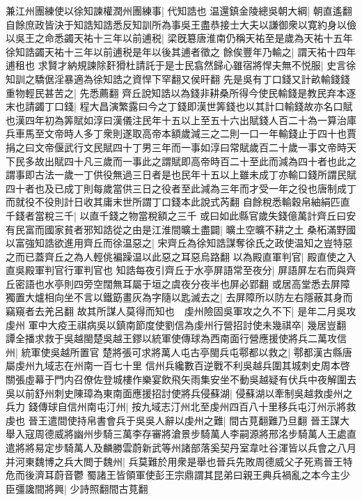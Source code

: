 兼江州團練使以徐知諫權潤州團練事|{
	代知誥也}
温還鎮金陵總吳朝大綱|{
	朝直遙翻}
自餘庶政皆決于知誥知誥悉反知訓所為事吳王盡恭接士大夫以謙御衆以寛約身以儉以吳王之命悉蠲天祐十三年以前逋税|{
	梁旣簒唐淮南仍稱天祐至是歲為天祐十五年徐知誥蠲天祐十三年以前逋税是年以後其逋者徵之}
餘俟豐年乃輸之|{
	謂天祐十四年逋租也}
求賢才納規諫除姧猾杜請託于是士民翕然歸心雖宿將悍夫無不悦服|{
	史言徐知訓之驕倨淫暴適為徐知誥之資悍下罕翻又侯旰翻}
先是吳有丁口錢又計畝輸錢錢重物輕民甚苦之|{
	先悉薦翻}
齊丘說知誥以為錢非耕桑所得今使民輸錢是教民弃本逐末也請蠲丁口錢|{
	程大昌演繁露曰今之丁錢即漢世筭錢也以其計口輸錢故亦名口賦也漢四年初為筭賦如淳曰漢儀注民年十五以上至五十六出賦錢人百二十為一算治庫兵車馬至文帝時人多丁衆則遂取高帝本額歲減三之二則一口一年輸錢止于四十也賈捐之曰文帝偃武行文民賦四十丁男三年而一事如淳曰常賦歲百二十歲一事文帝時天下民多故出賦四十凡三歲而一事此之謂賦即高帝時百二十至此而減為四十者也此之謂事即古法一歲一丁供役無過三日者是也民年十五以上雖未成丁亦輸口錢所謂民賦四十者也及已成丁則每歲當供三日之役者至此減為三年而才受一年之役也唐制成丁而就役不役則計日收其庸末世所謂丁口錢本此說式芮翻}
自餘稅悉輸穀帛紬絹匹直千錢者當稅三千|{
	以直千錢之物當稅額之三千}
或曰如此縣官歲失錢億萬計齊丘曰安有民富而國家貧者邪知誥從之由是江淮間曠土盡闢|{
	曠土空曠不耕之土}
桑柘滿野國以富強知誥欲進用齊丘而徐温惡之|{
	宋齊丘為徐知誥謀奪徐氏之政使温知之豈特惡之而已蓋齊丘之為人輕佻褊躁温以此惡之耳惡烏路翻}
以為殿直軍判官|{
	殿直使之入直吳殿軍判官行軍判官也}
知誥每夜引齊丘于水亭屏語常至夜分|{
	屏語屏左右而與齊丘密語也水亭則四旁空闊無耳屬于垣之虞夜分夜半也屏必郢翻}
或居高堂悉去屏障獨置大爐相向坐不言以鐵筯畫灰為字隨以匙滅去之|{
	去屏障所以防左右隱蔽其身而竊窺者去羌呂翻}
故其所謀人莫得而知也　虔州險固吳軍攻之久不下|{
	是年二月吳攻虔州}
軍中大疫王祺病吳以鎮南節度使劉信為虔州行營招討使未幾祺卒|{
	幾居豈翻}
譚全播求救于吳越閩楚吳越王鏐以統軍使傳球為西南面行營應援使將兵二萬攻信州|{
	統軍使吳越所置官}
楚將張可求將萬人屯古亭閩兵屯鄠都以救之|{
	鄠都漢古縣唐屬虔州九域志在州南一百七十里}
信州兵纔數百逆戰不利吳越兵圍其城刺史周本啓關張虛幕于門内召僚佐登城樓作樂宴飲飛矢雨集安坐不動吳越疑有伏兵中夜解圍去吳以前舒州刺史陳璋為東南面應援招討使將兵侵蘇湖|{
	侵蘇湖以牽制吳越救虔州之兵力}
錢傳球自信州南屯汀州|{
	按九域志汀州北至虔州四百八十里移兵屯汀州示將救虔也}
晉王遣間使持帛書會兵于吳吳人辭以虔州之難|{
	間古莧翻難乃旦翻}
晉王謀大舉入寇周德威將幽州步騎三萬李存審將滄景步騎萬人李嗣源將邢洺步騎萬人王處直遣將將易定步騎萬人及麟勝雲蔚新武等州諸部落奚契丹室韋吐谷渾皆以兵會之八月并河東魏博之兵大閲于魏州|{
	兵莫難於用衆是舉也晉兵先敗周德威父子死焉晉王特危而後濟耳蔚音鬱}
蜀諸王皆領軍使彭王宗鼎謂其昆弟曰親王典兵禍亂之本今主少臣彊讒間將興|{
	少詩照翻間古莧翻}
